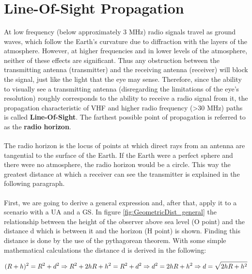 \section{Line-Of-Sight Propagation}\label{subsec:los_propagation}
\paragraph{}At low frequency (below approximately 3 MHz) radio signals travel as ground waves, which follow the Earth's curvature due to diffraction with the layers of the atmosphere.
However, at higher frequencies and in lower levels of the atmosphere, neither of these effects are significant. Thus any obstruction between the transmitting antenna (transmitter) and the receiving antenna (receiver) will block the signal, just like the light that the eye may sense. Therefore, since the ability to visually see a transmitting antenna (disregarding the limitations of the eye's resolution) roughly corresponds to the ability to receive a radio signal from it, the propagation characteristic of VHF and higher radio frequency (>30 MHz) paths is called \textbf{Line-Of-Sight}. The farthest possible point of propagation is referred to as the \textbf{radio horizon}.

\paragraph{}The radio horizon is the locus of points at which direct rays from an antenna are tangential to the surface of the Earth. If the Earth were a perfect sphere and there were no atmosphere, the radio horizon would be a circle.
This way the greatest distance at which a receiver can see the transmitter is explained in the following paragraph.

\paragraph{}First, we are going to derive a general expression and, after that, apply it to a scenario with a UA and a GS. In figure  \ref{fig:GeometricDist_general} the relationship between the height of the observer above sea level (O point) and the distance d which is between it and the horizon (H point) is shown. Finding this distance is done by the use of the pythagorean theorem. With some simple mathematical calculations the distance d is derived in the following:

\begin{equation}\label{eq:los_distToHorizon}
	(R+h)^2 = R^2+d^2\nonumber \\
	\Rightarrow R^2+2hR+h^2 = R^2+d^2 \Rightarrow d^2 = 2hR + h^2 \\
	\Rightarrow d = \sqrt{2hR + h^2}
\end{equation} 

